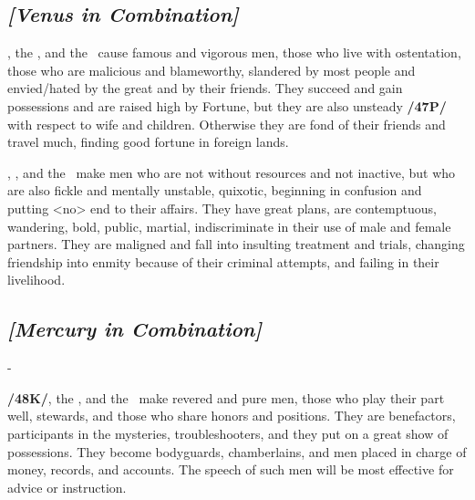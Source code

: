 \subsection{\textit{[Venus in Combination]}}
\Venus, the \Sun, and the \Moon\, cause famous and vigorous men, those who live with ostentation, those who are malicious and blameworthy, slandered by most people and envied/hated by the great and by their friends. They succeed and gain possessions and are raised high by Fortune, but they are also unsteady \textbf{/47P/} with respect to wife and children. Otherwise they are fond of their friends and travel much, finding good fortune in foreign lands.

\Venus, \Mars, and the \Moon\, make men who are not without resources and not inactive, but who are also fickle and mentally unstable, quixotic, beginning in confusion and putting <no> end to their affairs. They have great plans, are contemptuous, wandering, bold, public, martial, indiscriminate in their use of male and female partners. They are maligned and fall into insulting treatment and trials, changing friendship into enmity because of their criminal attempts, and failing in their livelihood.

\secbr
{}
\subsection{\textit{[Mercury in Combination]}}-

\textbf{/48K/}\Mercury, the \Sun, and the \Moon\, make revered and pure men, those who play their part well, stewards, and those who share honors and positions. They are benefactors, participants in the mysteries, troubleshooters, and they put on a great show of possessions. They become bodyguards, chamberlains, and men placed in charge of money, records, and accounts. The speech of such men will be most effective for advice or instruction.


